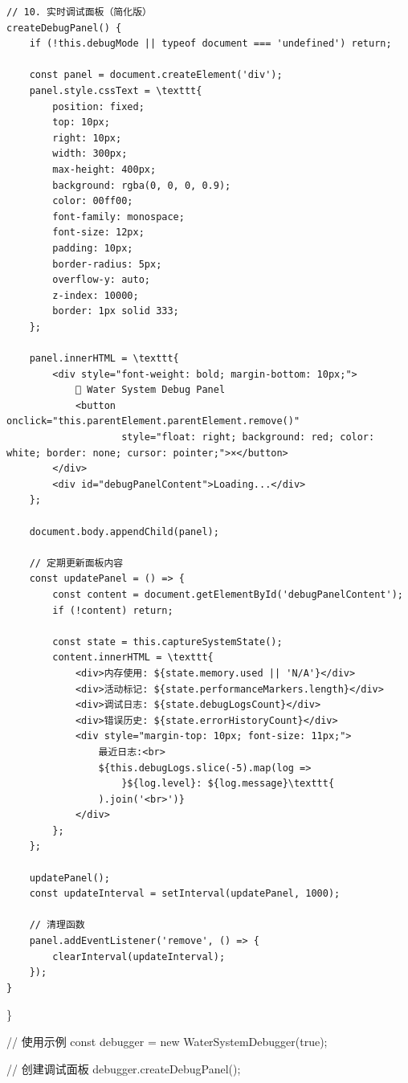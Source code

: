 {{\begin{verbatim}
// 10. 实时调试面板（简化版）
createDebugPanel() {
    if (!this.debugMode || typeof document === 'undefined') return;
    
    const panel = document.createElement('div');
    panel.style.cssText = \texttt{
        position: fixed;
        top: 10px;
        right: 10px;
        width: 300px;
        max-height: 400px;
        background: rgba(0, 0, 0, 0.9);
        color: 00ff00;
        font-family: monospace;
        font-size: 12px;
        padding: 10px;
        border-radius: 5px;
        overflow-y: auto;
        z-index: 10000;
        border: 1px solid 333;
    };
    
    panel.innerHTML = \texttt{
        <div style="font-weight: bold; margin-bottom: 10px;">
            🐛 Water System Debug Panel
            <button onclick="this.parentElement.parentElement.remove()" 
                    style="float: right; background: red; color: white; border: none; cursor: pointer;">×</button>
        </div>
        <div id="debugPanelContent">Loading...</div>
    };
    
    document.body.appendChild(panel);
    
    // 定期更新面板内容
    const updatePanel = () => {
        const content = document.getElementById('debugPanelContent');
        if (!content) return;
        
        const state = this.captureSystemState();
        content.innerHTML = \texttt{
            <div>内存使用: ${state.memory.used || 'N/A'}</div>
            <div>活动标记: ${state.performanceMarkers.length}</div>
            <div>调试日志: ${state.debugLogsCount}</div>
            <div>错误历史: ${state.errorHistoryCount}</div>
            <div style="margin-top: 10px; font-size: 11px;">
                最近日志:<br>
                ${this.debugLogs.slice(-5).map(log => 
                    }${log.level}: ${log.message}\texttt{
                ).join('<br>')}
            </div>
        };
    };
    
    updatePanel();
    const updateInterval = setInterval(updatePanel, 1000);
    
    // 清理函数
    panel.addEventListener('remove', () => {
        clearInterval(updateInterval);
    });
}
\end{verbatim}

\}

// 使用示例 const debugger = new WaterSystemDebugger(true);

// 创建调试面板 debugger.createDebugPanel();

}}
